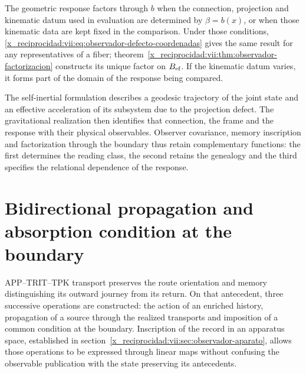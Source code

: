 The geometric response factors through \(b\) when the connection,
projection and kinematic datum used in evaluation are
determined by \(\beta=b(x)\), or when those kinematic data are
kept fixed in the comparison. Under those conditions,
\eqref{x_reciprocidad:vii:eq:observador-defecto-coordenadas} gives the same result
for any representatives of a fiber;
theorem~\ref{x_reciprocidad:vii:thm:observador-factorizacion} constructs its unique
factor on \(B_{\rm ef}\). If the kinematic datum varies, it
forms part of the domain of the response being compared.

The self-inertial formulation describes a geodesic trajectory of the
joint state and an effective acceleration of its subsystem due
to the projection defect. The gravitational realization then identifies
that connection, the frame and the response with their physical
observables. Observer covariance, memory inscription and
factorization through the boundary thus retain complementary functions:
the first determines the reading class, the second retains the
genealogy and the third specifies the relational dependence of the
response.




\chapter{Bidirectional propagation and absorption condition at the boundary}
\label{x_reciprocidad:vii:sec:propagacion-bidireccional}

APP--TRIT--TPK transport preserves the route orientation and memory
distinguishing its outward journey from its return. On that antecedent, three
successive operations are constructed: the action of an enriched history, propagation
of a source through the realized transports and imposition of a
common condition at the boundary. Inscription of the record in an apparatus
space, established in section~\ref{x_reciprocidad:vii:sec:observador-aparato}, allows
those operations to be expressed through linear maps without confusing the
observable publication with the state preserving its antecedents.

